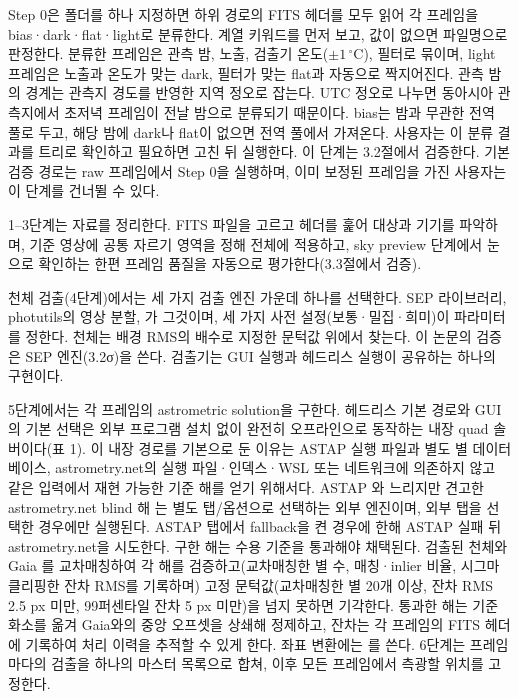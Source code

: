 Step 0은 폴더를 하나 지정하면 하위 경로의 FITS 헤더를 모두 읽어 각 프레임을 bias·dark·flat·light로 분류한다. \texttt{} 계열 키워드를 먼저 보고, 값이 없으면 파일명으로 판정한다. 분류한 프레임은 관측 밤, 노출, 검출기 온도($\pm1\,^\circ$C), 필터로 묶이며, light 프레임은 노출과 온도가 맞는 dark, 필터가 맞는 flat과 자동으로 짝지어진다. 관측 밤의 경계는 관측지 경도를 반영한 지역 정오로 잡는다. UTC 정오로 나누면 동아시아 관측지에서 초저녁 프레임이 전날 밤으로 분류되기 때문이다. bias는 밤과 무관한 전역 풀로 두고, 해당 밤에 dark나 flat이 없으면 전역 풀에서 가져온다. 사용자는 이 분류 결과를 트리로 확인하고 필요하면 고친 뒤 실행한다. 이 단계는 3.2절에서 검증한다. 기본 검증 경로는 raw 프레임에서 Step 0을 실행하며, 이미 보정된 프레임을 가진 사용자는 이 단계를 건너뛸 수 있다.



1–3단계는 자료를 정리한다. FITS 파일을 고르고 헤더를 훑어 대상과 기기를 파악하며, 기준 영상에 공통 자르기 영역을 정해 전체에 적용하고, sky preview 단계에서 눈으로 확인하는 한편 프레임 품질을 자동으로 평가한다(3.3절에서 검증).



천체 검출(4단계)에서는 세 가지 검출 엔진 가운데 하나를 선택한다. SEP 라이브러리\citep[SExtractor 백엔드;][]{bertin1996}, photutils의 영상 분할\citep[\texttt{}·\texttt{};][]{photutils, astropy2022}, \texttt{}가 그것이며, 세 가지 사전 설정(보통·밀집·희미)이 파라미터를 정한다. 천체는 배경 RMS의 배수로 지정한 문턱값 위에서 찾는다. 이 논문의 검증은 SEP 엔진(3.2σ)을 쓴다. 검출기는 GUI 실행과 헤드리스 실행이 공유하는 하나의 구현이다.



5단계에서는 각 프레임의 astrometric solution을 구한다. 헤드리스 기본 경로와 GUI의 기본 선택은 외부 프로그램 설치 없이 완전히 오프라인으로 동작하는 내장 quad 솔버이다(표 1). 이 내장 경로를 기본으로 둔 이유는 ASTAP 실행 파일과 별도 별 데이터베이스, astrometry.net의 실행 파일·인덱스·WSL 또는 네트워크에 의존하지 않고 같은 입력에서 재현 가능한 기준 해를 얻기 위해서다. ASTAP \citep{astap}와 느리지만 견고한 astrometry.net blind 해 \citep{lang2010}는 별도 탭/옵션으로 선택하는 외부 엔진이며, 외부 탭을 선택한 경우에만 실행된다. ASTAP 탭에서 fallback을 켠 경우에 한해 ASTAP 실패 뒤 astrometry.net을 시도한다. 구한 해는 수용 기준을 통과해야 채택된다. 검출된 천체와 Gaia \citep{gaia_dr3_2023}를 교차매칭하여 각 해를 검증하고(교차매칭한 별 수, 매칭·inlier 비율, 시그마 클리핑한 잔차 RMS를 기록하며) 고정 문턱값(교차매칭한 별 20개 이상, 잔차 RMS 2.5 px 미만, 99퍼센타일 잔차 5 px 미만)을 넘지 못하면 기각한다. 통과한 해는 기준 화소를 옮겨 Gaia와의 중앙 오프셋을 상쇄해 정제하고, 잔차는 각 프레임의 FITS 헤더에 기록하여 처리 이력을 추적할 수 있게 한다. 좌표 변환에는 \texttt{} \citep{astropy2013} 를 쓴다. 6단계는 프레임마다의 검출을 하나의 마스터 목록으로 합쳐, 이후 모든 프레임에서 측광할 위치를 고정한다.



